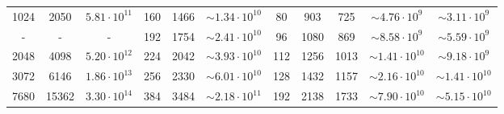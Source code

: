 \begin{table}[!htb]
{\begin{tabular}{|c|c|c|c|c|c|c|c|c|c|c|}
1024                                                        & 2050   & $5.81\cdot10^{11}$ & 160                                                         & 1466   & $\sim1.34\cdot10^{10}$ & 80                                                          & 903                                                        & 725                                                        & $\sim4.76\cdot10^{9}$                                             & $\sim3.11\cdot10^{9}$                                             \\
-                                                           & -      & -                  & 192                                                         & 1754   & $\sim2.41\cdot10^{10}$ & 96                                                          & 1080                                                       & 869                                                        & $\sim8.58\cdot10^{9}$                                             & $\sim5.59\cdot10^{9}$                                             \\
2048                                                        & 4098   & $5.20\cdot10^{12}$ & 224                                                         & 2042   & $\sim3.93\cdot10^{10}$ & 112                                                         & 1256                                                       & 1013                                                       & $\sim1.41\cdot10^{10}$                                            & $\sim9.18\cdot10^{9}$                                             \\
3072                                                        & 6146   & $1.86\cdot10^{13}$ & 256                                                         & 2330   & $\sim6.01\cdot10^{10}$ & 128                                                         & 1432                                                       & 1157                                                       & $\sim2.16\cdot10^{10}$                                            & $\sim1.41\cdot10^{10}$                                            \\
7680                                                        & 15362  & $3.30\cdot10^{14}$ & 384                                                         & 3484   & $\sim2.18\cdot10^{11}$ & 192                                                         & 2138                                                       & 1733                                                       & $\sim7.90\cdot10^{10}$                                            & $\sim5.15\cdot10^{10}$                                            \\

\end{tabular}}
\end{table}
